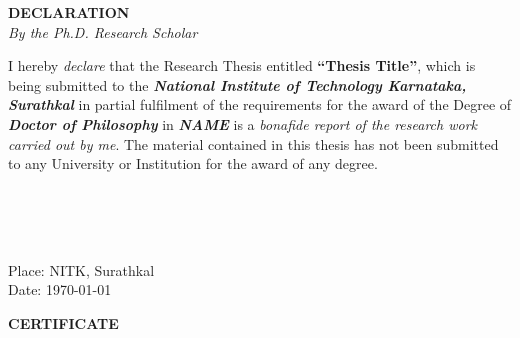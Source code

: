\documentclass[12pt, twoside,openright]{report}
\begin{document}

\thispagestyle{empty}

\begin{spacing}{1.5}

\newpage
\thispagestyle{empty}
\mbox{}
\newpage
\begin{titlepage}
\begin{center}
\large \textbf{DECLARATION} \\
\textit{By the Ph.D. Research Scholar}
\end{center}

\vspace*{0.5in}
\indent I hereby {\textit{declare}} that the Research Thesis entitled {\bf \textquotedblleft{Thesis Title\textquotedblright}}, which is being submitted to the {\bf\textit{National Institute of Technology Karnataka, Surathkal}} in partial fulfilment of the requirements for the award of the Degree of {\bf\textit{Doctor of Philosophy}} in {\bf\textit{NAME}} is a {\textit{bonafide report of the research work carried out by me}}. The material contained in this thesis has not been submitted to any University or Institution for the award of any degree.

\vspace*{1in}
\begin{singlespacing}
\hspace*{1.5in} 
\parbox{3in}
{\\
\\
\\
}
\end{singlespacing} 

\vspace*{1in}

\noindent Place: NITK, Surathkal\\
\noindent Date: \today 
\end{titlepage}

\newpage
\thispagestyle{empty}
\mbox{}
\newpage
\begin{titlepage}
\begin{center}
\large \textbf{CERTIFICATE}
\end{center}


\end{titlepage}
\end{spacing}
\end{document}
